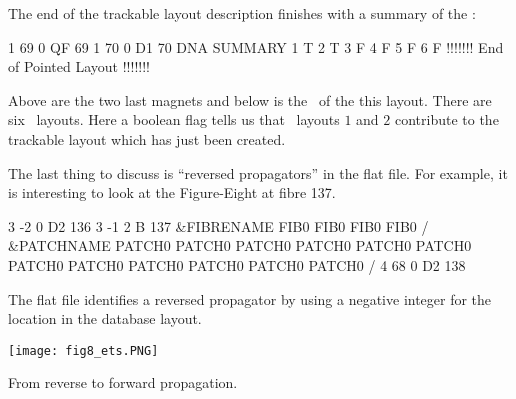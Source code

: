 The end of the trackable layout description finishes with a summary of the \DNA :


\begin{ptccode}
    1       69  0 QF                             69
    1       70  0 D1                             70                     
  DNA SUMMARY   \label{lin:end:dna}
           1 T
           2 T
           3 F
           4 F
           5 F
           6 F
  !!!!!!! End of Pointed Layout !!!!!!!

\end{ptccode}

Above  are the two last magnets and below is  the \DNA\ of the this layout. There are six  \DNA\ layouts. Here a boolean flag tells us that \DNA\ layouts $1$ and $2$ contribute to  the trackable layout which has just been created.

The last thing to discuss is ``reversed propagators'' in the flat file. For example, it is interesting to look at the Figure-Eight at fibre 137. 


\begin{ptccode}
    3       -2  0 D2                            136
    3       -1  2 B                             137
 &FIBRENAME
 FIB0%
 FIB0%
 FIB0%
 FIB0%
 /
 &PATCHNAME
 PATCH0%
 PATCH0%
 PATCH0%
 PATCH0%
 PATCH0%
 PATCH0%
 PATCH0%
 PATCH0%
 PATCH0%
 PATCH0%
 PATCH0%
 PATCH0%
 /
    4       68  0 D2                            138
\end{ptccode}

The flat file identifies a reversed propagator by using a negative integer for the location in the database layout.  
\begin{marginfigure}\forcerectofloat
  \texttt{[image: fig8\_ets.PNG]}
  \caption{From reverse to forward propagation.}
  \label{fig:min:plus}
\end{marginfigure}
%
%

